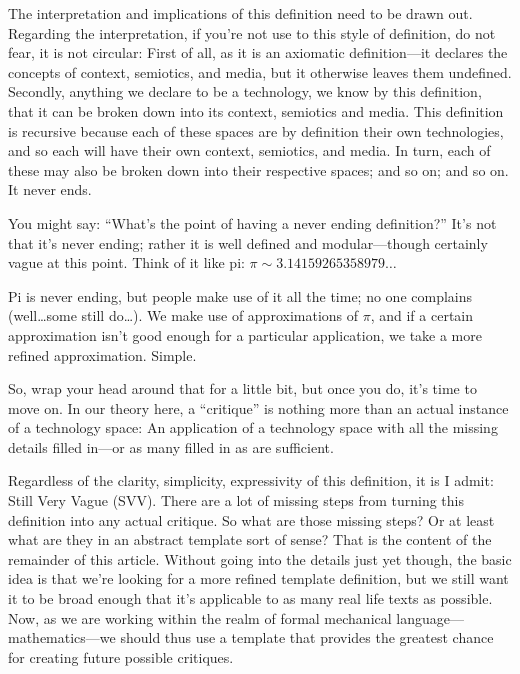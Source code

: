 \documentclass[twoside]{article}
\begin{document}
The interpretation and implications of this definition need to be drawn out. Regarding the interpretation, if you're
not use to this style of definition, do not fear, it is not circular: First of all, as it is an axiomatic definition---it
declares the concepts of context, semiotics, and media, but it otherwise leaves them undefined. Secondly, anything
we declare to be a technology, we know by this definition, that it can be broken down into its context, semiotics and media.
This definition is recursive because each of these spaces are by definition their own technologies, and so each will have
their own context, semiotics, and media. In turn, each of these may also be broken down into their respective spaces; and
so on; and so on.  It never ends.

You might say: ``What's the point of having a never ending definition?'' It's not that it's never ending; rather it is
well defined and modular---though certainly vague at this point. Think of it like pi: $ \pi\sim 3.14159265358979\ldots $

Pi is never ending, but people make use of it all the time; no one complains (well\ldots some still do\ldots).
We make use of approximations of $ \pi $, and if a certain approximation isn't good enough for a particular application,
we take a more refined approximation.  Simple.

So, wrap your head around that for a little bit, but once you do, it's time to move on. In our theory here, a ``critique'' is
nothing more than an actual instance of a technology space: An application of a technology space with all the missing details
filled in---or as many filled in as are sufficient.

Regardless of the clarity, simplicity, expressivity of this definition, it is I admit: Still Very Vague (SVV).
There are a lot of missing steps from turning this definition into any actual critique. So what are those missing
steps? Or at least what are they in an abstract template sort of sense? That is the content of the remainder of this article.
Without going into the details just yet though, the basic idea is that we're looking for a more refined template definition,
but we still want it to be broad enough that it's applicable to as many real life texts as possible. Now, as we are working
within the realm of formal mechanical language---mathematics---we should thus use a template that provides the greatest chance
for creating future possible critiques.
\end{document}
